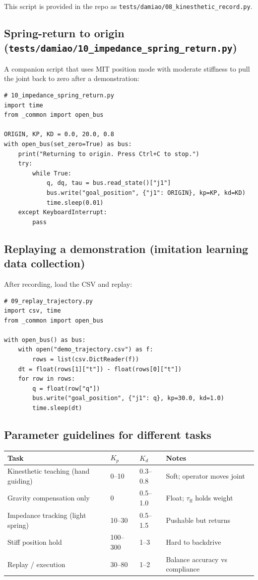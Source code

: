 \documentclass[11pt,a4paper]{article}
\begin{document}
\noindent This script is provided in the repo as
\texttt{tests/damiao/08\_kinesthetic\_record.py}.

\subsection{Spring-return to origin (\texttt{tests/damiao/10\_impedance\_spring\_return.py})}
A companion script that uses MIT position mode with moderate stiffness to pull
the joint back to zero after a demonstration:
\begin{lstlisting}
# 10_impedance_spring_return.py
import time
from _common import open_bus

ORIGIN, KP, KD = 0.0, 20.0, 0.8
with open_bus(set_zero=True) as bus:
    print("Returning to origin. Press Ctrl+C to stop.")
    try:
        while True:
            q, dq, tau = bus.read_state()["j1"]
            bus.write("goal_position", {"j1": ORIGIN}, kp=KP, kd=KD)
            time.sleep(0.01)
    except KeyboardInterrupt:
        pass
\end{lstlisting}

\subsection{Replaying a demonstration (imitation learning data collection)}
After recording, load the CSV and replay:
\begin{lstlisting}
# 09_replay_trajectory.py
import csv, time
from _common import open_bus

with open_bus() as bus:
    with open("demo_trajectory.csv") as f:
        rows = list(csv.DictReader(f))
    dt = float(rows[1]["t"]) - float(rows[0]["t"])
    for row in rows:
        q = float(row["q"])
        bus.write("goal_position", {"j1": q}, kp=30.0, kd=1.0)
        time.sleep(dt)
\end{lstlisting}

\subsection{Parameter guidelines for different tasks}
\begin{center}\small
\begin{tabular}{llll}
\toprule
Task & $K_p$ & $K_d$ & Notes\\
\midrule
Kinesthetic teaching (hand guiding) & 0--10 & 0.3--0.8 & Soft; operator moves joint\\
Gravity compensation only           & 0     & 0.5--1.0 & Float; $\tau_{\text{ff}}$ holds weight\\
Impedance tracking (light spring)   & 10--30 & 0.5--1.5 & Pushable but returns\\
Stiff position hold                 & 100--300 & 1--3  & Hard to backdrive\\
Replay / execution                  & 30--80 & 1--2  & Balance accuracy vs compliance\\
\bottomrule
\end{tabular}
\end{center}
\end{document}
